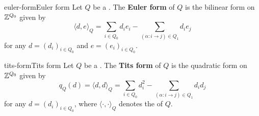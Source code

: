 \begin{topic}{euler-form}{Euler form}
    Let $Q$ be a . The \textbf{Euler form} of $Q$ is the bilinear form on $\mathbb{Z}^{Q_0}$ given by
    \[ \langle d, e \rangle_Q = \sum_{i \in Q_0} d_i e_i - \sum_{(\alpha : i \to j) \in Q_1} d_i e_j \]
    for any $d = (d_i)_{i \in Q_0}$ and $e = (e_i)_{i \in Q_0}$.
\end{topic}

\begin{topic}{tits-form}{Tits form}
    Let $Q$ be a . The \textbf{Tits form} of $Q$ is the quadratic form on $\mathbb{Z}^{Q_0}$ given by
    \[ q_Q(d) = \langle d, d \rangle_Q = \sum_{i \in Q_0} d_i^2 - \sum_{(\alpha : i \to j) \in Q_1} d_i d_j \]
    for any $d = (d_i)_{i \in Q_0}$, where $\langle \cdot, \cdot \rangle_Q$ denotes the  of $Q$.
\end{topic}
